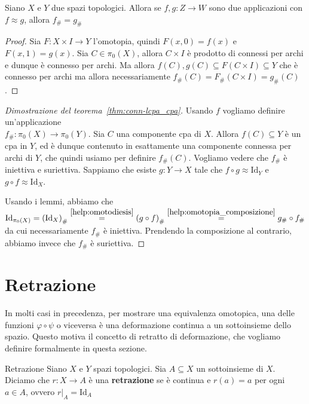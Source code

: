     \begin{lemma}\label{help:omotodiesis}
        Siano \(X\) e \(Y\) due spazi topologici. Allora se \(f, g : Z \to W\)
        sono due applicazioni con \(f \approx g\), allora \(f_\# = g_\#\)
    \end{lemma}
    \begin{proof}
        Sia \(F: X \times I \to Y\) l'omotopia, quindi \(F{(x, 0)} = f{(x)}\) e
    \(F{(x, 1)} = g{(x)}\). Sia \(C \in \pi_{0}{(X)}\), allora \(C \times I\) è
    prodotto di connessi per archi e dunque è connesso per archi. Ma allora
    \(f{(C)}, g{(C)}  \subseteq F{(C \times I)} \subseteq Y  \) che è connesso per archi
    ma allora necessariamente \(f_\# {(C)} = F_\#{(C \times I)} =g_\#{(C)}\).
    \end{proof}
\begin{proof}[Dimostrazione del teorema~\ref{thm:conn-lcpa_cpa}]
    Usando \(f\) vogliamo definire un'applicazione \\\(f_\# : \pi_{0}{(X)} \to 
    \pi_{0}{(Y)}\). Sia \(C\) una componente cpa di \(X\). Allora \(f{(C)}
    \subseteq Y \) è un cpa in \(Y\), ed è dunque contenuto in esattamente una 
    componente connessa per archi di \(Y\), che quindi usiamo per definire
    \(f_\# {(C)}\). Vogliamo vedere che \(f_\#\) è iniettiva e suriettiva.
    Sappiamo che esiste \(g : Y \to X\) tale che \(f \circ g \approx
    \mathrm{Id}_Y\) e \(g \circ f \approx \mathrm{Id}_X\).


    Usando i lemmi, abbiamo che \( \mathrm{Id}_{\pi_{0}{(X)}} =
    {(\mathrm{Id}_X)}_\# \overset{\ref{help:omotodiesis}}{=} {(g \circ f)}_\#
    \overset{\ref{help:omotopia_composizione}}{=} g_\# \circ f_\#\) da cui
    necessariamente \(f_\#\) è iniettiva. Prendendo la composizione al
    contrario, abbiamo invece che \(f_\#\) è suriettiva.
\end{proof}

\section{Retrazione}
In molti casi in precedenza, per mostrare una equivalenza omotopica, una delle
funzioni \(\varphi \circ \psi\) o viceversa è una deformazione continua a un
sottoinsieme dello spazio. Questo motiva il concetto di retratto di
deformazione, che vogliamo definire formalmente in questa sezione. 

\begin{definition}{Retrazione}
    Siano \(X\) e \(Y\) spazi topologici. Sia \(A \subseteq X\) un sottoinsieme
    di \(X\). Diciamo che \(r : X \to A\) è una \textbf{retrazione} se è continua
    e \(r{(a)} = a\) per ogni \(a \in A\), ovvero \(r|_A = \mathrm{Id}_A\) 
\end{definition}

